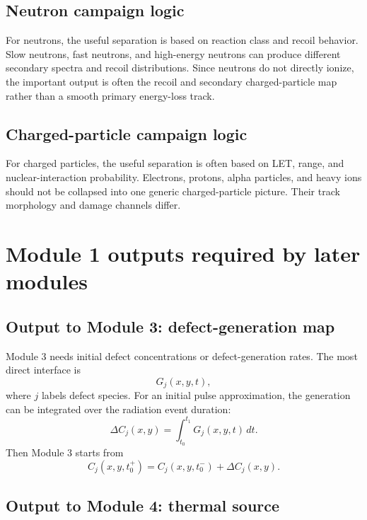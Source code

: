 \documentclass[11pt]{article}
\begin{document}
\subsection{Neutron campaign logic}

For neutrons, the useful separation is based on reaction class and recoil behavior. Slow neutrons, fast neutrons, and high-energy neutrons can produce different secondary spectra and recoil distributions. Since neutrons do not directly ionize, the important output is often the recoil and secondary charged-particle map rather than a smooth primary energy-loss track.

\subsection{Charged-particle campaign logic}

For charged particles, the useful separation is often based on LET, range, and nuclear-interaction probability. Electrons, protons, alpha particles, and heavy ions should not be collapsed into one generic charged-particle picture. Their track morphology and damage channels differ.

\section{Module 1 outputs required by later modules}

\subsection{Output to Module 3: defect-generation map}

Module 3 needs initial defect concentrations or defect-generation rates. The most direct interface is
\begin{equation}
G_j(x,y,t),
\end{equation}
where $j$ labels defect species. For an initial pulse approximation, the generation can be integrated over the radiation event duration:
\begin{equation}
\Delta C_j(x,y)
=
\int_{t_0}^{t_1}G_j(x,y,t)\,dt.
\end{equation}
Then Module 3 starts from
\begin{equation}
C_j(x,y,t_0^+)
=
C_j(x,y,t_0^-)+\Delta C_j(x,y).
\label{eq:initial_defect_update}
\end{equation}

\subsection{Output to Module 4: thermal source}
\end{document}
